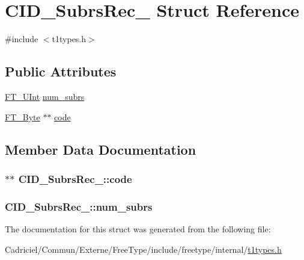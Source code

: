 \hypertarget{struct_c_i_d___subrs_rec__}{\section{C\-I\-D\-\_\-\-Subrs\-Rec\-\_\- Struct Reference}
\label{struct_c_i_d___subrs_rec__}
}


{\ttfamily \#include $<$t1types.\-h$>$}

\subsection*{Public Attributes}
\begin{DoxyCompactItemize}
\item 
\hyperlink{fttypes_8h_abcb8db4dbf35d2b55a9e8c7b0926dc52}{F\-T\-\_\-\-U\-Int} \hyperlink{struct_c_i_d___subrs_rec___a3abd23388e2e0f4888f826a993953c7e}{num\-\_\-subrs}
\item 
\hyperlink{fttypes_8h_a51f26183ca0c9f4af958939648caeccd}{F\-T\-\_\-\-Byte} $\ast$$\ast$ \hyperlink{struct_c_i_d___subrs_rec___a1a4f0a4e514492fccaf81d7ede6c4e08}{code}
\end{DoxyCompactItemize}


\subsection{Member Data Documentation}
\hypertarget{struct_c_i_d___subrs_rec___a1a4f0a4e514492fccaf81d7ede6c4e08}{
\subsubsection[{code}]{$\ast$$\ast$ C\-I\-D\-\_\-\-Subrs\-Rec\-\_\-\-::code}}\label{struct_c_i_d___subrs_rec___a1a4f0a4e514492fccaf81d7ede6c4e08}
\hypertarget{struct_c_i_d___subrs_rec___a3abd23388e2e0f4888f826a993953c7e}{
\subsubsection[{num\-\_\-subrs}]{ C\-I\-D\-\_\-\-Subrs\-Rec\-\_\-\-::num\-\_\-subrs}}\label{struct_c_i_d___subrs_rec___a3abd23388e2e0f4888f826a993953c7e}


The documentation for this struct was generated from the following file\-:\begin{DoxyCompactItemize}
\item 
Cadriciel/\-Commun/\-Externe/\-Free\-Type/include/freetype/internal/\hyperlink{t1types_8h}{t1types.\-h}\end{DoxyCompactItemize}

